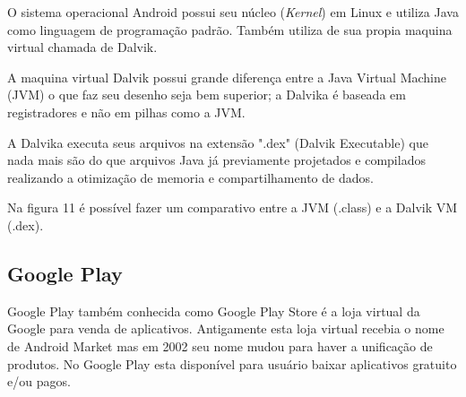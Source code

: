 O sistema operacional Android possui seu núcleo (\textit{Kernel}) em Linux e utiliza Java como linguagem de programação padrão. Também utiliza de sua propia maquina virtual chamada de Dalvik.

A maquina virtual Dalvik possui grande diferença entre a Java Virtual Machine (JVM) o que faz seu desenho seja bem superior; a Dalvika é baseada em registradores e não em pilhas como a JVM.

A Dalvika executa seus arquivos na extensão ".dex" (Dalvik Executable) que nada mais são do que arquivos Java já previamente projetados e compilados realizando a otimização de memoria e compartilhamento de dados.

Na figura 11 é possível fazer um comparativo entre a JVM (.class) e a Dalvik VM (.dex). \cite{desa}

\pagebreak
\begin{figure}[h!]
		\centering
	\end{figure}

\subsection{Google Play }

Google Play também conhecida como Google Play Store é a loja virtual da Google para venda de aplicativos. Antigamente esta loja virtual recebia o nome de Android Market mas em 2002 seu nome mudou para haver a unificação de produtos.
No Google Play esta disponível para usuário baixar aplicativos gratuito e/ou pagos. \cite{gp}

